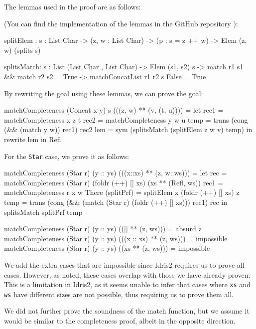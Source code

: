\documentclass[]{rptuseminar}
\begin{document}
The lemmas used in the proof are as follows:

(You can find the implementation of the lemmas in the GitHub repository \cite{idris-seminar}):

\begin{idris}
splitElem : {s : List Char} -> (z, w : List Char) ->
    (p : s = z ++ w) -> Elem (z, w) (splits s)

splitsMatch: {s : List (List Char , List Char)} -> Elem (s1, s2) s -> 
    match r1 s1 && match r2 s2 = True -> matchConcatList r1 r2 s False = True
\end{idris}

By rewriting the goal using these lemmas, we can prove the goal:

\begin{idris}
matchCompleteness (Concat x y) s (((z, w) ** (v, (t, u)))) = 
    let rec1 = matchCompleteness x z t
        rec2 = matchCompleteness y w u 
        temp = trans (cong (&& (match y w)) rec1) rec2
        lem = sym (splitsMatch (splitElem z w v) temp) in rewrite lem 
    in Refl
\end{idris}

For the \texttt{Star} case, we prove it as follows:

\begin{idris}
matchCompleteness (Star r) (y :: ys) (((x::xs) ** (z, w::ws))) = 
    let rec = matchCompleteness (Star r) (foldr (++) [] xs) (xs ** (Refl, ws))
        rec1 = matchCompleteness r x w
        There (splitPrf) = splitElem x (foldr (++) [] xs) z
        temp = trans (cong (&& (match (Star r) (foldr (++) [] xs))) rec1) rec
    in splitsMatch splitPrf temp 

matchCompleteness (Star r) (y :: ys) (([] ** (z, ws))) = absurd z
matchCompleteness (Star r) (y :: ys) (((x :: xs) ** (z, ws))) = impossible
matchCompleteness (Star r) (y :: ys) ((xs ** (z, ws))) = impossible
\end{idris}

We add the extra cases that are impossible since Idris2 requires us to prove all cases. However, as noted, these cases overlap with those we have already proven. This is a limitation in Idris2, as it seems unable to infer that cases where \texttt{xs} and \texttt{ws} have different sizes are not possible, thus requiring us to prove them all.

We did not further prove the soundness of the match function, but we assume it would be similar to the completeness proof, albeit in the opposite direction.
\end{document}
